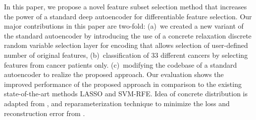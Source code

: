 \documentclass{bioinfo}
\begin{document}
In this paper, we propose a novel feature subset selection method that increases the power of a standard deep autoencoder for differentiable feature selection. 
Our major contributions in this paper are two-fold: (a)~we created a new variant of the standard autoencoder by introducing the use of a concrete relaxation discrete random variable selection layer for encoding that allows selection of user-defined number of original features, (b)~classification of 33 different cancers by selecting features from cancer patients only. (c)~modifying the codebase of a standard autoencoder to realize the proposed approach. Our evaluation shows the improved performance of the proposed approach in comparison to the existing state-of-the-art methods LASSO and SVM-RFE.
Idea of concrete distribution is adapted from \citep{maddison2016concrete, kingma2013auto}, and reparameterization technique to minimize the loss and reconstruction error from \citep{abid2019concrete}.
\end{document}
